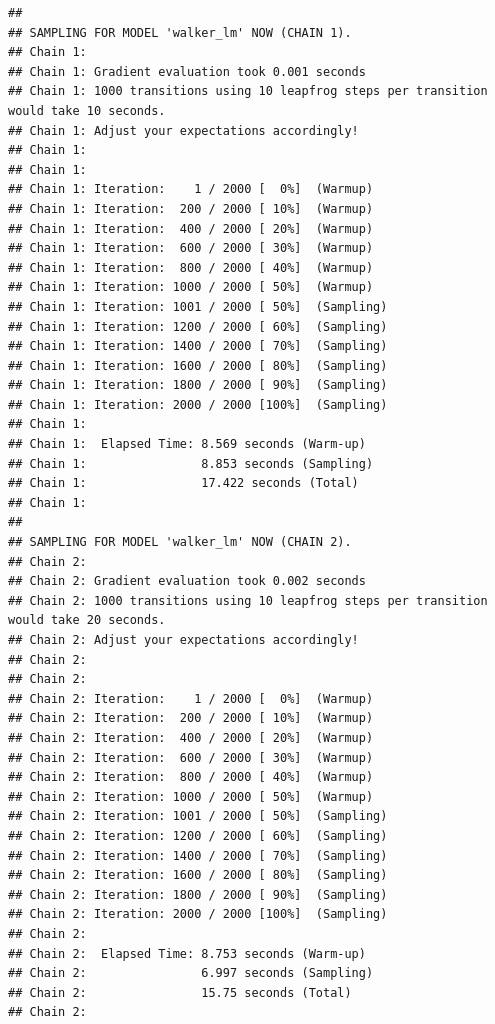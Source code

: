 \documentclass[
]{book}
\newenvironment{Shaded}{\begin{snugshade}}{\end{snugshade}}
\newcommand{\CommentTok}[1]{\textcolor[rgb]{0.56,0.35,0.01}{\textit{#1}}}
\newcommand{\DataTypeTok}[1]{\textcolor[rgb]{0.13,0.29,0.53}{#1}}
\newcommand{\FloatTok}[1]{\textcolor[rgb]{0.00,0.00,0.81}{#1}}
\newcommand{\KeywordTok}[1]{\textcolor[rgb]{0.13,0.29,0.53}{\textbf{#1}}}
\newcommand{\NormalTok}[1]{#1}
\newcommand{\OperatorTok}[1]{\textcolor[rgb]{0.81,0.36,0.00}{\textbf{#1}}}
\newcommand{\StringTok}[1]{\textcolor[rgb]{0.31,0.60,0.02}{#1}}
\begin{document}
\begin{verbatim}
## 
## SAMPLING FOR MODEL 'walker_lm' NOW (CHAIN 1).
## Chain 1: 
## Chain 1: Gradient evaluation took 0.001 seconds
## Chain 1: 1000 transitions using 10 leapfrog steps per transition would take 10 seconds.
## Chain 1: Adjust your expectations accordingly!
## Chain 1: 
## Chain 1: 
## Chain 1: Iteration:    1 / 2000 [  0%]  (Warmup)
## Chain 1: Iteration:  200 / 2000 [ 10%]  (Warmup)
## Chain 1: Iteration:  400 / 2000 [ 20%]  (Warmup)
## Chain 1: Iteration:  600 / 2000 [ 30%]  (Warmup)
## Chain 1: Iteration:  800 / 2000 [ 40%]  (Warmup)
## Chain 1: Iteration: 1000 / 2000 [ 50%]  (Warmup)
## Chain 1: Iteration: 1001 / 2000 [ 50%]  (Sampling)
## Chain 1: Iteration: 1200 / 2000 [ 60%]  (Sampling)
## Chain 1: Iteration: 1400 / 2000 [ 70%]  (Sampling)
## Chain 1: Iteration: 1600 / 2000 [ 80%]  (Sampling)
## Chain 1: Iteration: 1800 / 2000 [ 90%]  (Sampling)
## Chain 1: Iteration: 2000 / 2000 [100%]  (Sampling)
## Chain 1: 
## Chain 1:  Elapsed Time: 8.569 seconds (Warm-up)
## Chain 1:                8.853 seconds (Sampling)
## Chain 1:                17.422 seconds (Total)
## Chain 1: 
## 
## SAMPLING FOR MODEL 'walker_lm' NOW (CHAIN 2).
## Chain 2: 
## Chain 2: Gradient evaluation took 0.002 seconds
## Chain 2: 1000 transitions using 10 leapfrog steps per transition would take 20 seconds.
## Chain 2: Adjust your expectations accordingly!
## Chain 2: 
## Chain 2: 
## Chain 2: Iteration:    1 / 2000 [  0%]  (Warmup)
## Chain 2: Iteration:  200 / 2000 [ 10%]  (Warmup)
## Chain 2: Iteration:  400 / 2000 [ 20%]  (Warmup)
## Chain 2: Iteration:  600 / 2000 [ 30%]  (Warmup)
## Chain 2: Iteration:  800 / 2000 [ 40%]  (Warmup)
## Chain 2: Iteration: 1000 / 2000 [ 50%]  (Warmup)
## Chain 2: Iteration: 1001 / 2000 [ 50%]  (Sampling)
## Chain 2: Iteration: 1200 / 2000 [ 60%]  (Sampling)
## Chain 2: Iteration: 1400 / 2000 [ 70%]  (Sampling)
## Chain 2: Iteration: 1600 / 2000 [ 80%]  (Sampling)
## Chain 2: Iteration: 1800 / 2000 [ 90%]  (Sampling)
## Chain 2: Iteration: 2000 / 2000 [100%]  (Sampling)
## Chain 2: 
## Chain 2:  Elapsed Time: 8.753 seconds (Warm-up)
## Chain 2:                6.997 seconds (Sampling)
## Chain 2:                15.75 seconds (Total)
## Chain 2:
\end{verbatim}

\begin{Shaded}
\end{Shaded}
\end{document}
